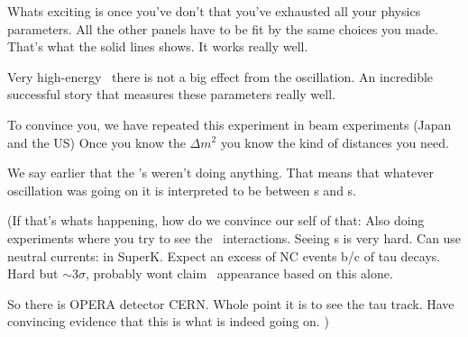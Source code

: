 {Whats exciting is once you've don't that you've exhausted all your physics parameters.  
All the other panels have to be fit by the same choices you made. 
That's what the solid lines shows. 
It works really well.

Very high-energy \nus\ there is not a big effect from the oscillation.
An incredible successful story that measures these parameters really well. 

To convince you, we have repeated this experiment in beam experiments (Japan and the US) 
Once you know the $\Delta m^2$ you know the kind of distances you need.

We say earlier that the \nue's weren't doing anything. 
That means that whatever oscillation was going on it is interpreted to be between \numu s  and \nutau s.

(If that's whats happening, how do we convince our self of that:
Also doing experiments where you try to see the \nutau\ interactions. 
Seeing \nutau s is very hard. 
Can use neutral currents: in SuperK. 
Expect an excess of NC events b/c of tau decays. 
Hard but $\sim3\sigma$, probably wont claim \nutau\ appearance based on this alone. 

So there is OPERA detector CERN. 
Whole point it is to see the tau track.  
Have convincing evidence that this is what is indeed going on.
)

}



